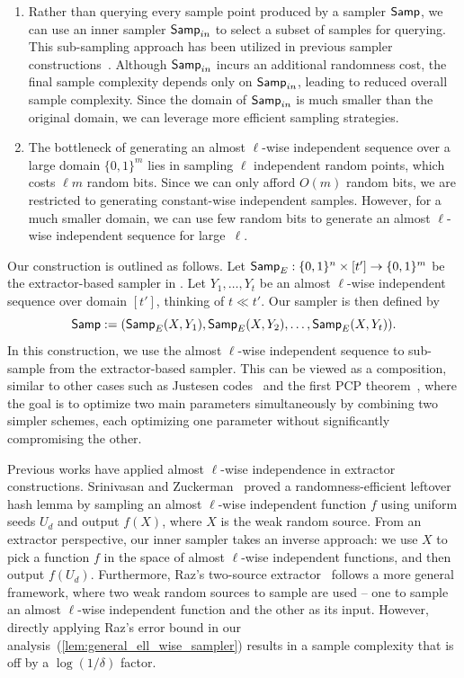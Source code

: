 \documentclass[10pt,a4paper]{article}
\newcommand{\1}{\mathbbm{1}}
\newcommand{\zo}{\{0, 1\}}
\newcommand{\Smp}{\textup{\textsf{Samp}}}
\begin{document}
\begin{enumerate}
    \item Rather than querying every sample point produced by a sampler $\Smp$, we can use an inner sampler $\Smp_{in}$ to select a subset of samples for querying.  This sub-sampling approach has been utilized in previous sampler constructions~\cite{bellare1994randomness, oded_survey}. Although $\Smp_{in}$ incurs an additional randomness cost, the final sample complexity depends only on $\Smp_{in}$, leading to reduced overall sample complexity. Since the domain of $\Smp_{in}$ is much smaller than the original domain, we can leverage more efficient sampling strategies.
    
\item  The bottleneck of generating an almost $\ell$-wise independent  sequence over a large domain $\zo^m$ lies in sampling $\ell$ independent random points, which costs $\ell m$ random bits. Since we can only afford $O(m)$ random bits, we are restricted to generating constant-wise independent  samples. However, for a much smaller domain, we can use few random bits to generate an almost $\ell$-wise independent  sequence for large~$\ell$. \label{o2}
\end{enumerate}

Our construction is outlined as follows. 
 Let $\Smp_{E}: \zo^n \times [t'] \to \zo^m$ be the extractor-based sampler in \cite{reingold2000entropy}.
 Let $Y_1, \dots, Y_{t}$ be an almost $\ell$-wise independent  sequence over domain $[t']$, thinking of $t \ll t'$. Our sampler is then defined by \[
    \Smp := (\Smp_{E}(X, Y_1), \Smp_{E}(X, Y_2), \dots, \Smp_{E}(X, Y_{t})).
 \]
In this construction, we use the almost $\ell$-wise independent  sequence to sub-sample from the extractor-based sampler. This can be viewed as a composition, similar to other cases such as Justesen codes~\cite{Jus72} and the first PCP theorem~\cite{PCP}, where the goal is to optimize two main parameters simultaneously by combining two simpler schemes, each optimizing one parameter without significantly compromising the other.

Previous works have applied almost $\ell$-wise independence in extractor constructions. Srinivasan and Zuckerman~\cite{SZ99} proved a randomness-efficient leftover hash lemma by sampling an almost $\ell$-wise independent function $f$ using uniform seeds $U_d$ and output $f(X)$, where $X$ is the weak random source. From an extractor perspective, our inner sampler takes an inverse approach: we use $X$ to pick a function $f$ in the space of almost $\ell$-wise independent functions, and then output $f(U_d)$. Furthermore, Raz's two-source extractor~\cite{Raz05} follows a more general framework, where two weak random sources to sample are used -- one to sample an almost $\ell$-wise independent function and the other as its input. However, directly applying Raz's error bound in our analysis~(\cref{lem:general_ell_wise_sampler}) results in a sample complexity that is off by a $\log (1 / \delta)$ factor.
\end{document}
